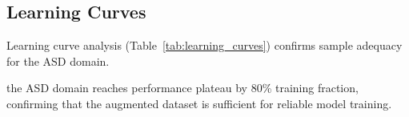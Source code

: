 
\subsection{Learning Curves}

Learning curve analysis (Table~\ref{tab:learning_curves}) confirms sample adequacy for the ASD domain.

%

\iffalse %

\fi

the ASD domain reaches performance plateau by 80\% training fraction, confirming that the augmented dataset is sufficient for reliable model training.


